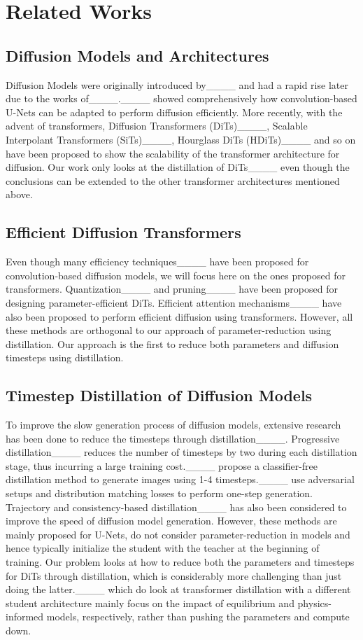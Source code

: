 \section{Related Works}
\vspace{-5pt}
\label{app: related works}
\subsection{Diffusion Models and Architectures}
Diffusion Models were originally introduced by____ and had a rapid rise later due to the works of____.____ showed comprehensively how convolution-based U-Nets can be adapted to perform diffusion efficiently. More recently, with the advent of transformers, Diffusion Transformers (DiTs)____, Scalable Interpolant Transformers (SiTs)____, Hourglass DiTs (HDiTs)____ and so on have been proposed to show the scalability of the transformer architecture for diffusion. Our work only looks at the distillation of DiTs____ even though the conclusions can be extended to the other transformer architectures mentioned above.

\subsection{Efficient Diffusion Transformers}
Even though many efficiency techniques____ have been proposed for convolution-based diffusion models, we will focus here on the ones proposed for transformers. Quantization____ and pruning____ have been proposed for designing parameter-efficient DiTs. Efficient attention mechanisms____ have also been proposed to perform efficient diffusion using transformers. However, all these methods are orthogonal to our approach of parameter-reduction using distillation. Our approach is the first to reduce both parameters and diffusion timesteps using distillation.

\subsection{Timestep Distillation of Diffusion Models}
To improve the slow generation process of diffusion models, extensive research has been done to reduce the timesteps through distillation____. Progressive distillation____ reduces the number of timesteps by two during each distillation stage, thus incurring a large training cost.____ propose a classifier-free distillation method to generate images using 1-4 timesteps.____ use adversarial setups and distribution matching losses to perform one-step generation. Trajectory and consistency-based distillation____ has also been considered to improve the speed of diffusion model generation. However, these methods are mainly proposed for U-Nets, do not consider parameter-reduction in models and hence typically initialize the student with the teacher at the beginning of training. Our problem looks at how to reduce both the parameters and timesteps for DiTs through distillation, which is considerably more challenging than just doing the latter.____ which do look at transformer distillation with a different student architecture mainly focus on the impact of equilibrium and physics-informed models, respectively, rather than pushing the parameters and compute down.

